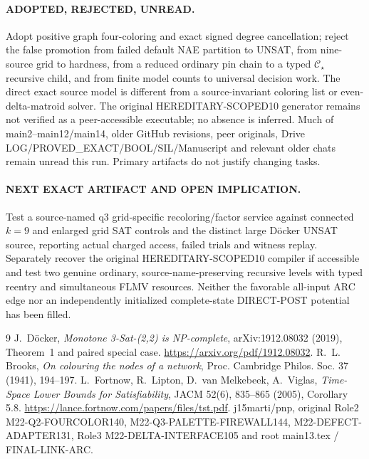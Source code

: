 \documentclass[11pt]{article}
\newcommand{\CS}{\mathcal C_\star}
\begin{document}
\paragraph{ADOPTED, REJECTED, UNREAD.}
Adopt positive graph four-coloring and exact signed
degree cancellation; reject the false promotion
from failed default NAE partition to UNSAT,
from nine-source grid to hardness, from
a reduced ordinary pin chain to a typed $\CS$
recursive child, and from finite model counts
to universal decision work. The direct exact
source model is different from a source-invariant
coloring list or even-delta-matroid solver.
The original HEREDITARY-SCOPED10 generator remains
not verified as a peer-accessible executable; no
absence is inferred. Much of main2--main12/main14,
older GitHub revisions, peer originals,
Drive LOG/PROVED\_EXACT/BOOL/SIL/Manuscript
and relevant older chats remain unread this run.
Primary artifacts do not justify changing tasks.

\paragraph{NEXT EXACT ARTIFACT AND OPEN IMPLICATION.}
Test a source-named q3 grid-specific recoloring/factor
service against connected $k=9$ and enlarged grid
SAT controls and the distinct large Döcker
UNSAT source, reporting actual charged access,
failed trials and witness replay. Separately
recover the original HEREDITARY-SCOPED10
compiler if accessible and test two genuine
ordinary, source-name-preserving recursive levels
with typed reentry and simultaneous FLMV resources.
Neither the favorable all-input ARC edge nor
an independently initialized complete-state
DIRECT-POST potential has been filled.

\begin{thebibliography}{9}
 J.~D\"ocker, \emph{Monotone 3-Sat-(2,2) is NP-complete},
arXiv:1912.08032 (2019), Theorem~1 and paired special case.
\url{https://arxiv.org/pdf/1912.08032}.
 R.~L. Brooks, \emph{On colouring the nodes of a network},
Proc. Cambridge Philos. Soc. 37 (1941), 194--197.
 L.~Fortnow, R.~Lipton, D.~van Melkebeek, A.~Viglas,
\emph{Time-Space Lower Bounds for Satisfiability},
JACM 52(6), 835--865 (2005), Corollary 5.8.
\url{https://lance.fortnow.com/papers/files/tst.pdf}.
 j15marti/pnp, original Role2
M22-Q2-FOURCOLOR140, M22-Q3-PALETTE-FIREWALL144,
M22-DEFECT-ADAPTER131, Role3 M22-DELTA-INTERFACE105
and root main13.tex / FINAL-LINK-ARC.
\end{thebibliography}
\end{document}
